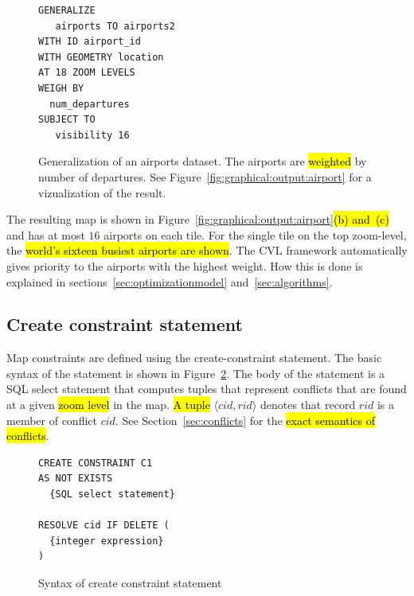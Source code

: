 \begin{figure}[h]
\vspace*{-2ex}
\begin{center}
\begin{lstlisting}
GENERALIZE 
   airports TO airports2
WITH ID airport_id
WITH GEOMETRY location
AT 18 ZOOM LEVELS
WEIGH BY
  num_departures
SUBJECT TO 
   visibility 16 
\end{lstlisting}
\vspace*{-1ex}
\caption{Generalization of an airports dataset. The airports are \hl{weighted} by number of departures. See Figure~\ref{fig:graphical:output:airport} for a vizualization of the result.}
\label{fig:cvl:example:airports}
\end{center}
\vspace*{-2ex}
\end{figure}



The resulting map is shown in Figure~\ref{fig:graphical:output:airport}\hl{(b) and~(c)} and has at most $16$ airports on each tile. For the single tile on the top zoom-level, the \hl{world's sixteen busiest airports are shown}. The CVL framework automatically gives priority to the airports with the highest weight. How this is done is explained in sections~\ref{sec:optimizationmodel} and~\ref{sec:algorithms}.

\subsection{Create constraint statement}
\label{sec:create:constraint:statement}

Map constraints are defined using the create-constraint statement.  The basic syntax of the statement is shown in Figure~\ref{fig:create:constraint:syntax}. The body of the statement is a SQL select statement that computes tuples that represent conflicts that are found at a given \hl{zoom level} in the map. \hl{A tuple }$\langle cid, rid\rangle$ denotes that record $rid$ is a member of conflict $cid$. See Section~\ref{sec:conflicts} for the \hl{exact semantics of conflicts}.

\begin{figure}[h]
\begin{center}
\begin{lstlisting}
CREATE CONSTRAINT C1
AS NOT EXISTS
  {SQL select statement}
  
RESOLVE cid IF DELETE (
  {integer expression}
)
\end{lstlisting}
\vspace*{-1.5ex}
\caption{Syntax of create constraint statement}
\label{fig:create:constraint:syntax}
\end{center}
\vspace*{-2ex}
\end{figure}

